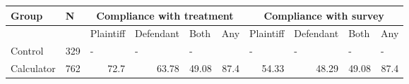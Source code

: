 \begin{tabular}{lrrrrrrrrr}
\toprule
Group & \multicolumn{1}{l}{N} & \multicolumn{4}{c}{Compliance with treatment} & \multicolumn{4}{c}{Compliance with survey} \\
\midrule
\midrule
      &       & \multicolumn{1}{l}{Plaintiff} & \multicolumn{1}{l}{Defendant} & \multicolumn{1}{l}{Both} & \multicolumn{1}{l}{Any} & \multicolumn{1}{l}{Plaintiff} & \multicolumn{1}{l}{Defendant } & \multicolumn{1}{l}{Both } & \multicolumn{1}{l}{Any} \\
\midrule
\midrule
Control & 329   & \multicolumn{1}{l}{-} & \multicolumn{1}{l}{-} & \multicolumn{1}{l}{-} &       & \multicolumn{1}{l}{-} & \multicolumn{1}{l}{-} & \multicolumn{1}{l}{-} & \multicolumn{1}{l}{-} \\
Calculator & 762   & 72.7  & 63.78 & 49.08 & 87.4  & 54.33 & 48.29 & 49.08 & 87.4 \\
\bottomrule
\end{tabular}%
